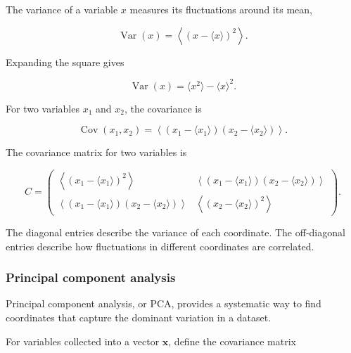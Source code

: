 The variance of a variable $x$ measures its fluctuations around its mean,

\begin{equation}
    \operatorname{Var}(x)=\left\langle\left(x-\langle x\rangle\right)^2\right\rangle.
\end{equation}

Expanding the square gives

\begin{equation}
    \operatorname{Var}(x)=\langle x^2\rangle-\langle x\rangle^2.
\end{equation}

For two variables $x_1$ and $x_2$, the covariance is

\begin{equation}
    \operatorname{Cov}(x_1,x_2)=\left\langle\left(x_1-\langle x_1\rangle\right)\left(x_2-\langle x_2\rangle\right)\right\rangle.
\end{equation}

The covariance matrix for two variables is

\begin{equation}
    C=
    \begin{pmatrix}
        \left\langle\left(x_1-\langle x_1\rangle\right)^2\right\rangle &
        \left\langle\left(x_1-\langle x_1\rangle\right)\left(x_2-\langle x_2\rangle\right)\right\rangle \\
        \left\langle\left(x_1-\langle x_1\rangle\right)\left(x_2-\langle x_2\rangle\right)\right\rangle &
        \left\langle\left(x_2-\langle x_2\rangle\right)^2\right\rangle
    \end{pmatrix}.
\end{equation}

The diagonal entries describe the variance of each coordinate.
The off-diagonal entries describe how fluctuations in different coordinates are correlated.


\subsubsection{Principal component analysis}

Principal component analysis, or PCA, provides a systematic way to find coordinates that capture the dominant variation in a dataset.

For variables collected into a vector $\mathbf{x}$, define the covariance matrix

